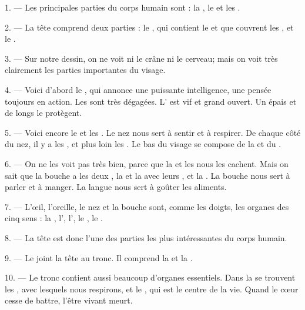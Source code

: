 \VUsaut{3.0mm}

1. --- Les principales parties du corps humain sont : la , le
 et les .

2. --- La tête comprend deux parties : le , qui contient le
 et que couvrent les , et le
.

3. --- Sur notre dessin, on ne voit ni le crâne ni le cerveau; mais on voit
très clairement les parties importantes du visage.

4. --- Voici d'abord le , qui annonce une puissante
intelligence, une pensée toujours en action. Les  sont très
dégagées. L' est vif et grand ouvert. Un  épais et
de longs  le protègent.

5. --- Voici encore le  et les . Le nez nous sert
à sentir et à respirer. De chaque côté du nez, il y a les , et
plus loin les . Le bas du visage se compose de la
 et du .

6. --- On ne les voit pas très bien, parce que la  et les
 nous les cachent. Mais on sait que la bouche a les deux
, la  et la  avec leurs , et la . La bouche nous
sert à parler et à manger. La langue nous sert à goûter les aliments.

7. --- L'œil, l'oreille, le nez et la bouche sont, comme les doigts, les
organes des cinq sens : la , l', l',
le , le .

8. --- La tête est donc l'une des parties les plus intéressantes du corps
humain.

\VUsaut{4.4mm}
\VUsaut{3.0mm}

9. --- Le  joint la tête au tronc. Il comprend la 
et la .

10. --- Le tronc contient aussi beaucoup d'organes essentiels. Dans la
 se trouvent les , avec lesquels nous
respirons, et le , qui est le centre de la vie. Quand le cœur
cesse de battre, l'être vivant meurt.

